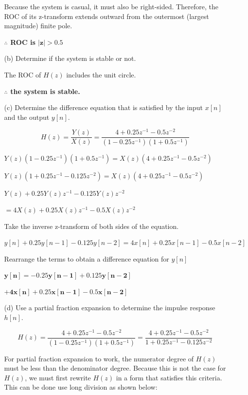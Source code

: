 \documentclass[fleqn]{article}
\begin{document}
\begin{enumerate}[nolistsep]
\begin{enumerate}[nolistsep]
					Because the system is casual, it must also be right-sided. Therefore, the ROC of its z-transform extends outward from
the outermost (largest magnitude) finite pole.

					\textbf{$\mathbf{\therefore}$ ROC is $\mathbf{|z| > 0.5}$}
					
				\item[(b)] Determine if the system is stable or not.
					
					The ROC of $H(z)$ includes the unit circle.
				
					\textbf{$\mathbf{\therefore}$ the system is stable.}
				 
				 \item[(c)] Determine the difference equation that is satisfied by the input $x[n]$ and the output $y[n]$.
				 
				 	\begin{equation*}
				 		H(z) = \frac{Y(z)}{X(z)} = \frac{4 + 0.25z^{-1}-0.5z^{-2}}{(1-0.25z^{-1})(1 + 0.5z^{-1})}
				 	\end{equation*}
				 	
				 	$Y(z)(1-0.25z^{-1})(1 + 0.5z^{-1}) = X(z)(4 + 0.25z^{-1}-0.5z^{-2})$
				 	
				 	$Y(z)(1 + 0.25z^{-1} - 0.125z^{-2}) = X(z)(4 + 0.25z^{-1}-0.5z^{-2})$
				 	
				 	$Y(z) + 0.25Y(z)z^{-1} - 0.125Y(z)z^{-2}$
				 	
				 	$= 4X(z) + 0.25X(z)z^{-1}-0.5X(z)z^{-2}$
				 	
				 	Take the inverse z-transform of both sides of the equation.
				 	
				 	$y[n] + 0.25y[n-1] - 0.125y[n-2] = 4x[n] + 0.25x[n-1] - 0.5x[n-2]$
				 	
				 	Rearrange the terms to obtain a difference equation for $y[n]$
				 	
				 	$\mathbf{y[n] = -0.25y[n-1] + 0.125y[n-2]}$
				 	
				 	$\mathbf{ + 4x[n] + 0.25x[n-1] - 0.5x[n-2]}$
				 	
				 \item[(d)] Use a partial fraction expansion to determine the impulse response $h[n]$.
				 
				 	\begin{equation*}
				 		H(z) = \frac{4 + 0.25z^{-1}-0.5z^{-2}}{(1-0.25z^{-1})(1 + 0.5z^{-1})} = \frac{4 + 0.25z^{-1}-0.5z^{-2}}{1 + 0.25z^{-1} - 0.125z^{-2}}
				 	\end{equation*}
				 	
				 	For partial fraction expansion to work, the numerator degree of $H(z)$ must be less than the denominator degree. Because this is not the case for $H(z)$, we must first rewrite $H(z)$ in a form that satisfies this criteria. This can be done use long division as shown below:
						

\end{enumerate}
\end{enumerate}
\end{document}
